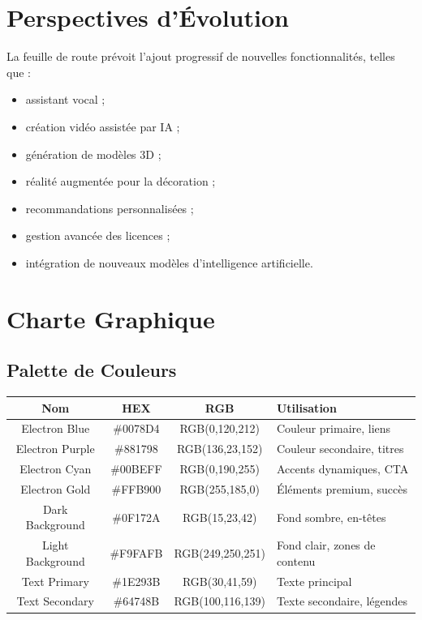 \documentclass[12pt,a4paper,oneside]{book}
\begin{document}
\chapter{Perspectives d'Évolution}

La feuille de route prévoit l'ajout progressif de nouvelles fonctionnalités, telles que :

\begin{itemize}
\item assistant vocal ;
\item création vidéo assistée par IA ;
\item génération de modèles 3D ;
\item réalité augmentée pour la décoration ;
\item recommandations personnalisées ;
\item gestion avancée des licences ;
\item intégration de nouveaux modèles d'intelligence artificielle.
\end{itemize}

\chapter{Charte Graphique}

\section{Palette de Couleurs}
\bigskip
\begin{center}
\begin{tabular}{|c|c|c|p{5cm}|}
\hline
\rowcolor{electronblue}
\color{white}\textbf{Nom} & \color{white}\textbf{HEX} & \color{white}\textbf{RGB} & \color{white}\textbf{Utilisation} \\
\hline
Electron Blue & \#0078D4 & RGB(0,120,212) & Couleur primaire, liens \\
\hline
Electron Purple & \#881798 & RGB(136,23,152) & Couleur secondaire, titres \\
\hline
Electron Cyan & \#00BEFF & RGB(0,190,255) & Accents dynamiques, CTA \\
\hline
Electron Gold & \#FFB900 & RGB(255,185,0) & Éléments premium, succès \\
\hline
Dark Background & \#0F172A & RGB(15,23,42) & Fond sombre, en-têtes \\
\hline
Light Background & \#F9FAFB & RGB(249,250,251) & Fond clair, zones de contenu \\
\hline
Text Primary & \#1E293B & RGB(30,41,59) & Texte principal \\
\hline
Text Secondary & \#64748B & RGB(100,116,139) & Texte secondaire, légendes \\
\hline
\end{tabular}
\end{center}
\end{document}
